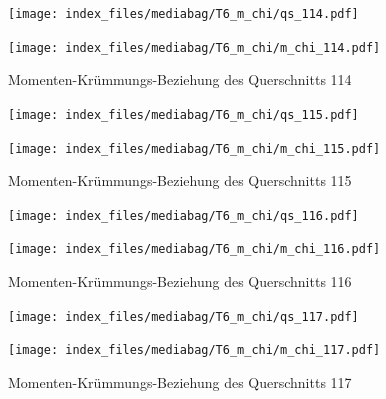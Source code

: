 \documentclass[
  11pt,
  letterpaper,
]{scrreprt}
\begin{document}
\begin{figure}[H]

\begin{minipage}{0.50\linewidth}
\texttt{[image: index\_files/mediabag/T6\_m\_chi/qs\_114.pdf]}\end{minipage}%
%
\begin{minipage}{0.50\linewidth}
\texttt{[image: index\_files/mediabag/T6\_m\_chi/m\_chi\_114.pdf]}\end{minipage}%

\caption{\label{fig-mchi_anhang}Momenten-Krümmungs-Beziehung des
Querschnitts 114}

\end{figure}%

\begin{figure}[H]

\begin{minipage}{0.50\linewidth}
\texttt{[image: index\_files/mediabag/T6\_m\_chi/qs\_115.pdf]}\end{minipage}%
%
\begin{minipage}{0.50\linewidth}
\texttt{[image: index\_files/mediabag/T6\_m\_chi/m\_chi\_115.pdf]}\end{minipage}%

\caption{\label{fig-mchi_anhang}Momenten-Krümmungs-Beziehung des
Querschnitts 115}

\end{figure}%

\begin{figure}[H]

\begin{minipage}{0.50\linewidth}
\texttt{[image: index\_files/mediabag/T6\_m\_chi/qs\_116.pdf]}\end{minipage}%
%
\begin{minipage}{0.50\linewidth}
\texttt{[image: index\_files/mediabag/T6\_m\_chi/m\_chi\_116.pdf]}\end{minipage}%

\caption{\label{fig-mchi_anhang}Momenten-Krümmungs-Beziehung des
Querschnitts 116}

\end{figure}%

\begin{figure}[H]

\begin{minipage}{0.50\linewidth}
\texttt{[image: index\_files/mediabag/T6\_m\_chi/qs\_117.pdf]}\end{minipage}%
%
\begin{minipage}{0.50\linewidth}
\texttt{[image: index\_files/mediabag/T6\_m\_chi/m\_chi\_117.pdf]}\end{minipage}%

\caption{\label{fig-mchi_anhang}Momenten-Krümmungs-Beziehung des
Querschnitts 117}

\end{figure}%
\end{document}
